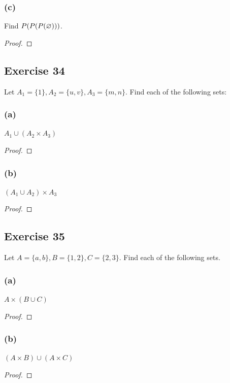 \documentclass[14pt]{extarticle}
\let\mathscr\relax
\newcommand{\ps}{\mathscr{P}}
\newcommand{\es}{\varnothing}
\begin{document}
\subsubsection{(c)}
Find \(\ps(\ps(\ps(\es)))\).

\begin{proof}

\end{proof}

\subsection{Exercise 34}
Let \(A_1 = \{1\}, A_2 = \{u, v\}, A_3 = \{m, n\}\). Find each of the following sets:

\subsubsection{(a)}
$A_1 \cup (A_2 \times A_3)$

\begin{proof}

\end{proof}

\subsubsection{(b)}
$(A_1 \cup A_2) \times A_3$

\begin{proof}

\end{proof}

\subsection{Exercise 35}
Let \(A = \{a, b\}, B = \{1, 2\}, C = \{2, 3\}\). Find each of the following sets.

\subsubsection{(a)}
$A \times (B \cup C)$

\begin{proof}

\end{proof}

\subsubsection{(b)}
$(A \times B) \cup (A \times C)$
\begin{proof}

\end{proof}
\end{document}
